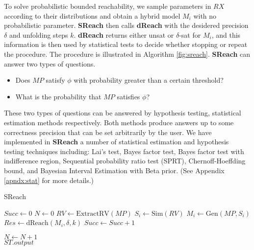 To solve probabilistic bounded reachability, we sample parameters in $RX$ according 
to their distributions and obtain a hybrid model $M_i$ with no probabilistic 
parameter. {\bf SReach} then calls {\bf dReach} \cite{gaodelta} with the desidered precision $\delta$ and 
unfolding steps $k$. {\bf dReach} returns either unsat or $\delta$-sat for $M_i$, and this information
is then used by statistical tests to decide whether stopping or repeat the procedure. The procedure is illustrated in Algorithm \ref{fig:sreach}. {\bf SReach} can answer two types of questions. 
\begin{itemize}
\item Does $MP$ satisfy $\phi$ with probability
greater than a certain threshold? 
\item What is the probability that $MP$ satisfies $\phi$?
\end{itemize}
These two types of questions can be answered by hypothesis testing, 
statistical estimation methods respectively. Both methods produce answers up to some correctness 
precision that can be set arbitrarily by the user.
We have implemented in {\bf SReach} a number of statistical estimation and hypothesis testing techniques including: {Lai's test}, {Bayes factor test}, {Bayes factor test with indifference region}, {Sequential probability ratio test (SPRT)}, {Chernoff-Hoeffding bound}, and Bayesian Interval Estimation with Beta prior. (See Appendix \ref{apndx:stat} for more details.) 
\begin{algorithm}
  \centering
  \caption{SReach}
  \label{fig:sreach}
  \begin{algorithmic}[1]
        \State $Succ \gets 0$	
        \State $N \gets 0$	
        \State $RV \gets \mathrm{ExtractRV}(MP)$	
        \Repeat
            \State $S_i \gets \mathrm{Sim}(RV)$		
            \State $M_i \gets \mathrm{Gen}(MP, S_i)$	
            \State $Res \gets \mathrm{dReach}(M_i, \delta, k)$	
		\State $Succ \gets Succ + 1$
	    
	  \EndIf
	\State $N \gets N + 1$
        	\\
	\quad\hspace{0.5ex} \Return $ST.output$
   \EndFunction
  \end{algorithmic}
\end{algorithm}

